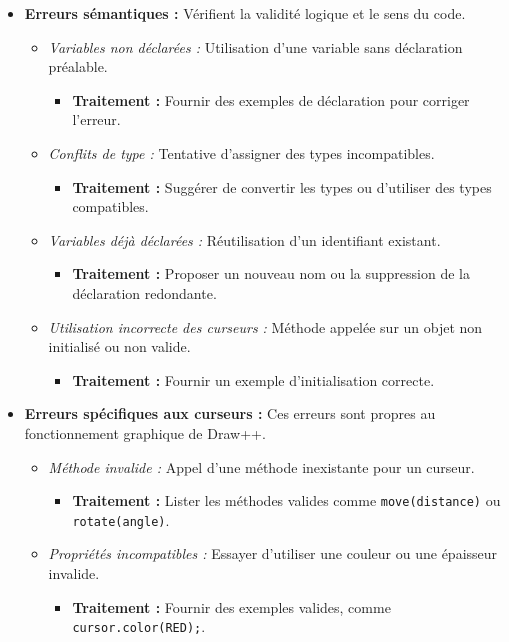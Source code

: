 \documentclass[12pt,a4paper]{report}
\begin{document}
\begin{itemize}
    \item \textbf{Erreurs sémantiques :} Vérifient la validité logique et le sens du code.
    \begin{itemize}
        \item \textit{Variables non déclarées :} Utilisation d'une variable sans déclaration préalable.
        \begin{itemize}
            \item \textbf{Traitement :} Fournir des exemples de déclaration pour corriger l'erreur.
        \end{itemize}
        \item \textit{Conflits de type :} Tentative d'assigner des types incompatibles.
        \begin{itemize}
            \item \textbf{Traitement :} Suggérer de convertir les types ou d'utiliser des types compatibles.
        \end{itemize}
        \item \textit{Variables déjà déclarées :} Réutilisation d'un identifiant existant.
        \begin{itemize}
            \item \textbf{Traitement :} Proposer un nouveau nom ou la suppression de la déclaration redondante.
        \end{itemize}
        \item \textit{Utilisation incorrecte des curseurs :} Méthode appelée sur un objet non initialisé ou non valide.
        \begin{itemize}
            \item \textbf{Traitement :} Fournir un exemple d'initialisation correcte.\\
        \end{itemize}
    \end{itemize}

    \item \textbf{Erreurs spécifiques aux curseurs :} Ces erreurs sont propres au fonctionnement graphique de Draw++.
    \begin{itemize}
        \item \textit{Méthode invalide :} Appel d'une méthode inexistante pour un curseur.
        \begin{itemize}
            \item \textbf{Traitement :} Lister les méthodes valides comme \texttt{move(distance)} ou \texttt{rotate(angle)}.
        \end{itemize}
        \item \textit{Propriétés incompatibles :} Essayer d'utiliser une couleur ou une épaisseur invalide.
        \begin{itemize}
            \item \textbf{Traitement :} Fournir des exemples valides, comme \texttt{cursor.color(RED);}.
        \end{itemize}
    \end{itemize}
\end{itemize}
\end{document}
